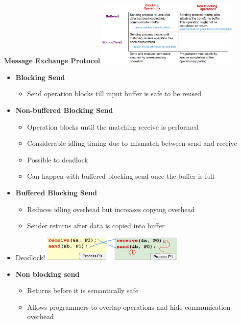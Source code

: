 \documentclass[10pt, landscape]{article}
\begin{document}
\begin{multicols}{4}
\textbf{Message Exchange Protocol}
\includegraphics*[width=7cm]{buffered_non_buffered.png}
\begin{itemize}
    \item \textbf{Blocking Send}
    \begin{itemize}
        \item Send operation blocks till input buffer is safe to be reused 
    \end{itemize}
    \item \textbf{Non-buffered Blocking Send}
    \begin{itemize}
        \item Operation blocks until the matching receive is performed 
        \item Considerable idling timing due to mismatch between send and receive 
        \item Possible to deadlock 
        \item Can happen with buffered blocking send once the buffer is full
    \end{itemize}
    \item \textbf{Buffered Blocking Send}
    \begin{itemize}
        \item Reduces idling overhead but increases copying overhead
        \item Sender returns after data is copied into buffer 
    \end{itemize}
    \item Deadlock! 
    \includegraphics*[width=7cm]{deadlock.png}

    \item \textbf{Non blocking send}
    \begin{itemize}
        \item Returns before it is semantically safe 
        \item Allows programmers to overlap operations and hide communication overhead
    \end{itemize}
\end{itemize}


\end{multicols}
\end{document}
